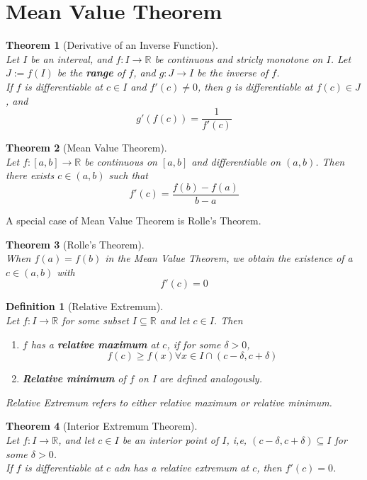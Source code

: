 \documentclass[12pt]{article}
\newtheorem{definition}{Definition}[section]
\newtheorem{theorem}{Theorem}[section]
\theoremstyle{definition}
\begin{document}
\section{Mean Value Theorem}
\begin{theorem}[Derivative of an Inverse Function]
\hfill\\\normalfont Let $I$ be an interval, and $f:I\to\mathbb{R}$ be continuous and stricly monotone on $I$. Let $J:=f(I)$ be the \textbf{range} of $f$, and $g:J\to I$ be the inverse of $f$.\\
If $f$ is differentiable at $c\in I$ and $f'(c)\neq 0$, then $g$ is differentiable at $f(c)\in J$, and
\[
g'(f(c)) = \frac{1}{f'(c)}
\]
\end{theorem}
\begin{theorem}[Mean Value Theorem]
\hfill\\\normalfont Let $f:[a,b]\to\mathbb{R}$ be continuous on $[a,b]$ and differentiable on $(a,b)$. Then there exists $c\in (a,b)$ such that
\[
f'(c)=\frac{f(b)-f(a)}{b-a}
\]
\end{theorem}
A special case of Mean Value Theorem is Rolle's Theorem. 
\begin{theorem}[Rolle's Theorem]
\hfill\\\normalfont When $f(a)=f(b)$ in the Mean Value Theorem, we obtain the existence of a $c\in(a,b)$ with
\[
f'(c)=0
\]
\end{theorem}
\begin{definition}[Relative Extremum]
\hfill\\\normalfont Let $f:I\to \mathbb{R}$ for some subset $I\subseteq \mathbb{R}$ and let $c\in I$. Then
\begin{enumerate}
	\item $f$ has a \textbf{relative maximum} at $c$, if for some $\delta>0$,
	\[
f(c)\geq f(x)\forall x\in I\cap (c-\delta, c+\delta)
	\]
	\item \textbf{Relative minimum} of $f$ on I are defined analogously.
\end{enumerate}
Relative Extremum refers to either relative maximum or relative minimum.
\end{definition}
\begin{theorem}[Interior Extremum Theorem]
\hfill\\\normalfont Let $f:I\to\mathbb{R}$, and let $c\in I$ be an interior point of $I$, i,e, $(c-\delta, c+\delta)\subseteq I$ for some $\delta>0$.\\
If $f$ is differentiable at $c$ adn has a relative extremum at $c$, then $f'(c)=0$.
\end{theorem}
\end{document}
